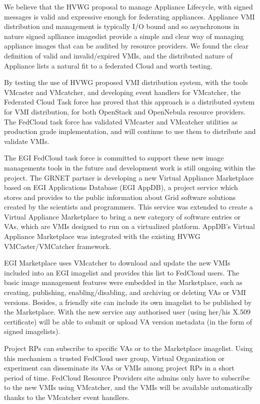 \documentclass{cai}
\begin{document}
We believe that the HVWG proposal to manage Appliance Lifecycle, with signed messages is valid and expressive enough for federating appliances. 
Appliance VMI distribution and management is typically I/O bound and so asynchronous in nature signed aplliance imageslist provide a simple and clear way of managing appliance images that can be audited by resource providers. 
We found the clear definition of valid and invalid/expired VMIs, and the distributed nature of Appliance lists a natural fit to a federated Cloud and worth testing.

By testing the use of HVWG proposed VMI distribution system, with the tools VMcaster and VMcatcher, and developing event handlers for VMcatcher, the Federated Cloud Task force has proved that this approach is a distributed system for VMI distribution, for both OpenStack and OpenNebula resource providers. 
The FedCloud task force has validated VMcaster and VMcatcher utilities as production grade implementation, and will continue to use them to distribute and validate VMIs.

The EGI FedCloud task force is committed to support these new image managements tools in the future and development work is still ongoing within the project. 
The GRNET partner is developing a new Virtual Appliance Marketplace based on EGI Applications Database (EGI AppDB), a project service which stores and provides to the public information about Grid software solutions created by the scientists and programmers.
This service was extended to create a Virtual Appliance Marketplace to bring a new category of software entries or VAs, which are VMIs designed to run on a virtualized platform.
AppDB's Virtual Appliance Marketplace was integrated with the existing HVWG VMCaster/VMCatcher framework.

EGI Marketplace uses VMcatcher to download and update the new VMIs included into an EGI imagelist and provides this list to FedCloud users.  
The basic image management features were embedded in the Marketplace, such as creating, publishing, enabling/disabling, and archiving or deleting VAs or VMI versions.
Besides, a friendly site can include its own imagelist to be published by the Marketplace. 
With the new service any authorised user (using her/his X.509 certificate) will be able to submit or upload VA version metadata (in the form of signed imagelists).
 
Project RPs can subscribe to specific VAs or to the Marketplace imagelist. Using this mechanism a trusted FedCloud user group, Virtual Organization or experiment can disseminate its VAs or VMIs among project RPs in a short period of time.
FedCloud Resource Providers site admins only have to subscribe to the new VMIs using VMcatcher, and the VMIs will be available automatically thanks to the VMcatcher event handlers.
\end{document}
